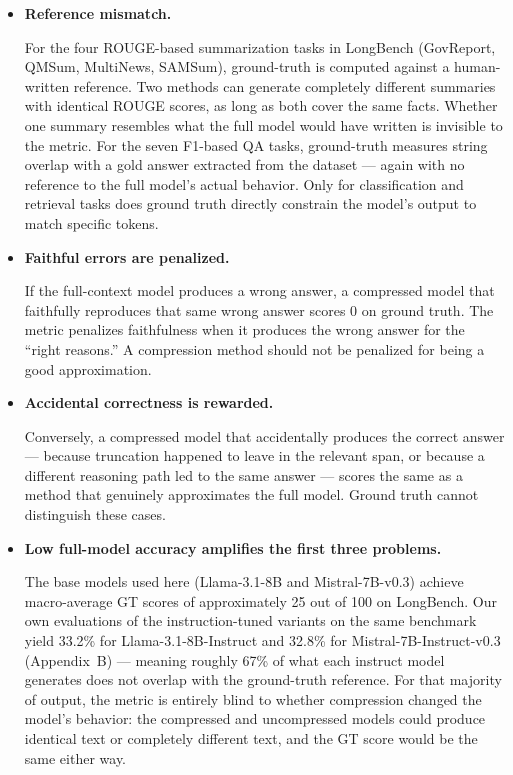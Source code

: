 \documentclass[10pt,letterpaper]{article}
\begin{document}
\begin{itemize}
\item
  \textbf{Reference mismatch.}

  For the four ROUGE-based summarization
  tasks in LongBench (GovReport, QMSum, MultiNews, SAMSum), ground-truth
  is computed against a human-written reference. Two methods can
  generate completely different summaries with identical ROUGE scores,
  as long as both cover the same facts. Whether one summary resembles
  what the full model would have written is invisible to the metric. For
  the seven F1-based QA tasks, ground-truth measures string overlap with
  a gold answer extracted from the dataset --- again with no reference
  to the full model's actual behavior. Only for classification and
  retrieval tasks does ground truth directly constrain the model's
  output to match specific tokens.
\item
  \textbf{Faithful errors are penalized.}

  If the full-context model
  produces a wrong answer, a compressed model that faithfully reproduces
  that same wrong answer scores 0 on ground truth. The metric penalizes
  faithfulness when it produces the wrong answer for the ``right
  reasons.'' A compression method should not be penalized for being a
  good approximation.
\item
  \textbf{Accidental correctness is rewarded.}

  Conversely, a compressed
  model that accidentally produces the correct answer --- because
  truncation happened to leave in the relevant span, or because a
  different reasoning path led to the same answer --- scores the same as
  a method that genuinely approximates the full model. Ground truth
  cannot distinguish these cases.
\item
  \textbf{Low full-model accuracy amplifies the first three problems.}

  The base models used here (Llama-3.1-8B and Mistral-7B-v0.3) achieve
  macro-average GT scores of approximately 25 out of 100 on LongBench.
  Our own evaluations of the instruction-tuned variants on the same
  benchmark yield 33.2\% for Llama-3.1-8B-Instruct and 32.8\% for
  Mistral-7B-Instruct-v0.3 (Appendix~B) --- meaning roughly 67\% of what
  each instruct model generates does not overlap with the ground-truth
  reference. For that majority of output, the metric is entirely blind
  to whether compression changed the model's behavior: the compressed
  and uncompressed models could produce identical text or completely
  different text, and the GT score would be the same either way.


\end{itemize}
\end{document}
